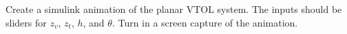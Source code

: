 
Create a simulink animation of the planar VTOL system.
The inputs should be sliders for $z_v$, $z_t$, $h$, and $\theta$.
Turn in a screen capture of the animation.
